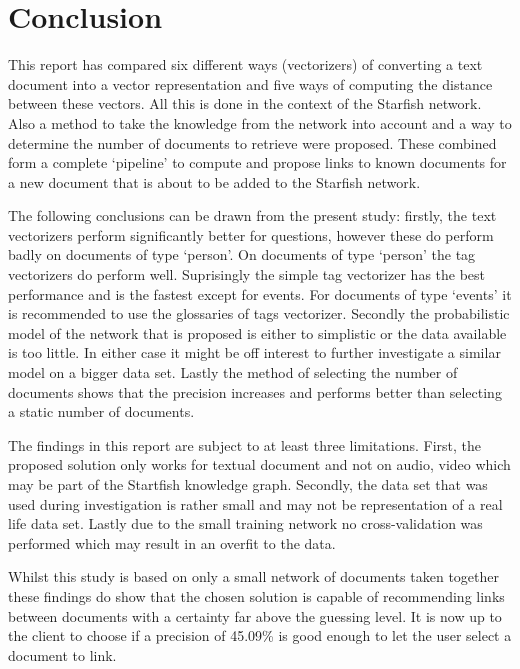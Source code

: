\section{Conclusion}
This report has compared six different ways (vectorizers) of converting a text
document into a vector representation and five ways of computing the distance
between these vectors. All this is done in the context of the Starfish network.
Also a method to take the knowledge from the network into account and a way to
determine the number of documents to retrieve were proposed. These combined
form a complete `pipeline' to compute and propose links to known documents for
a new document that is about to be added to the Starfish network.

The following conclusions can be drawn from the present study: firstly, the
text vectorizers perform significantly better for questions, however these do
perform badly on documents of type `person'. On documents of type `person' the
tag vectorizers do perform well. Suprisingly the simple tag vectorizer has the
best performance and is the fastest except for events. For documents of type
`events' it is recommended to use the glossaries of tags vectorizer.  Secondly
the probabilistic model of the network that is proposed is either to simplistic
or the data available is too little. In either case it might be off interest to
further investigate a similar model on a bigger data set. Lastly the method
of selecting the number of documents shows that the precision increases and
performs better than selecting a static number of documents.

The findings in this report are subject to at least three limitations. First,
the proposed solution only works for textual document and not on audio, video
which may be part of the Startfish knowledge graph. Secondly, the data set
that was used during investigation is rather small and may not be representation
of a real life data set. Lastly due to the small training network no cross-validation
was performed which may result in an overfit to the data.

Whilst this study is based on only a small network of documents taken together
these findings do show that the chosen solution is capable of recommending
links between documents with a certainty far above the guessing level. It is
now up to the client to choose if a precision of 45.09\%
is good enough to let the user select a document to link.

